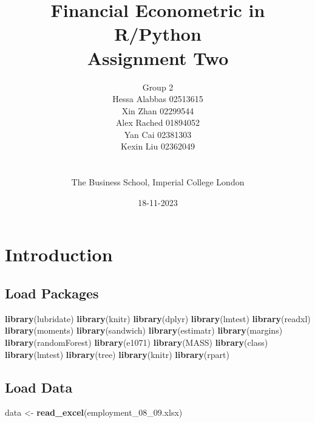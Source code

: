 \documentclass[
]{article}
\title{Financial Econometric in R/Python\\
Assignment Two}
\author{Group 2\\
Hessa Alabbas 02513615\\
Xin Zhan 02299544\\
Alex Rached 01894052\\
Yan Cai 02381303\\
Kexin Liu 02362049\\
\strut \\
The Business School, Imperial College London\\}
\date{18-11-2023}
\newenvironment{Shaded}{\begin{snugshade}}{\end{snugshade}}
\newcommand{\FunctionTok}[1]{\textcolor[rgb]{0.13,0.29,0.53}{\textbf{#1}}}
\newcommand{\NormalTok}[1]{#1}
\newcommand{\OtherTok}[1]{\textcolor[rgb]{0.56,0.35,0.01}{#1}}
\newcommand{\StringTok}[1]{\textcolor[rgb]{0.31,0.60,0.02}{#1}}
\begin{document}
\maketitle

\newpage
\tableofcontents
\listoftables
\newpage

\pagebreak

\hypertarget{introduction}{%
\section{Introduction}\label{introduction}}

\hypertarget{load-packages}{%
\subsection{Load Packages}\label{load-packages}}

\begin{Shaded}
\begin{Highlighting}[]
\FunctionTok{library}\NormalTok{(lubridate)}
\FunctionTok{library}\NormalTok{(knitr)}
\FunctionTok{library}\NormalTok{(dplyr)}
\FunctionTok{library}\NormalTok{(lmtest)}
\FunctionTok{library}\NormalTok{(readxl)}
\FunctionTok{library}\NormalTok{(moments)}
\FunctionTok{library}\NormalTok{(sandwich)}
\FunctionTok{library}\NormalTok{(estimatr)}
\FunctionTok{library}\NormalTok{(margins) }
\FunctionTok{library}\NormalTok{(randomForest)}
\FunctionTok{library}\NormalTok{(e1071) }
\FunctionTok{library}\NormalTok{(MASS) }
\FunctionTok{library}\NormalTok{(class) }
\FunctionTok{library}\NormalTok{(lmtest)}
\FunctionTok{library}\NormalTok{(tree)}
\FunctionTok{library}\NormalTok{(knitr)}
\FunctionTok{library}\NormalTok{(rpart)}
\end{Highlighting}
\end{Shaded}

\hypertarget{load-data}{%
\subsection{Load Data}\label{load-data}}

\begin{Shaded}
\begin{Highlighting}[]
\NormalTok{data }\OtherTok{\textless{}{-}}  \FunctionTok{read\_excel}\NormalTok{(}\StringTok{\textquotesingle{}employment\_08\_09.xlsx\textquotesingle{}}\NormalTok{)}
\end{Highlighting}
\end{Shaded}
\end{document}
